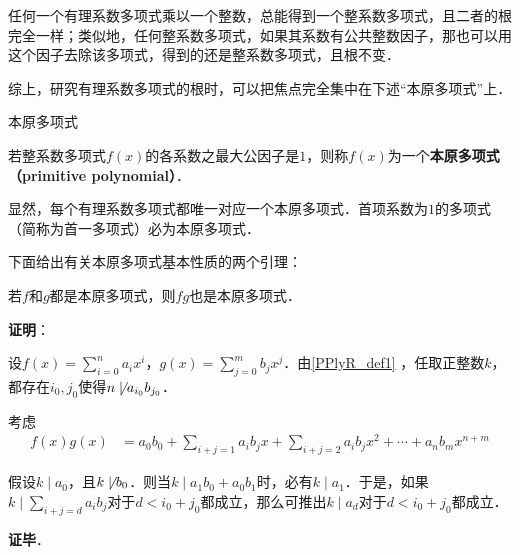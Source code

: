 
任何一个有理系数多项式乘以一个整数，总能得到一个整系数多项式，且二者的根完全一样；类似地，任何整系数多项式，如果其系数有公共整数因子，那也可以用这个因子去除该多项式，得到的还是整系数多项式，且根不变．

综上，研究有理系数多项式的根时，可以把焦点完全集中在下述“本原多项式”上．


\begin{definition}{本原多项式}\label{PPlyR_def1}

若整系数多项式$f(x)$的各系数之最大公因子是$1$，则称$f(x)$为一个\textbf{本原多项式（primitive polynomial）}．

\end{definition}

显然，每个有理系数多项式都唯一对应一个本原多项式．首项系数为$1$的多项式（简称为首一多项式）必为本原多项式．

下面给出有关本原多项式基本性质的两个引理：

\begin{lemma}{}
若$f$和$g$都是本原多项式，则$fg$也是本原多项式．
\end{lemma}

\textbf{证明}：

设$f(x) = \sum_{i=0}^n a_ix^i$，$g(x) = \sum_{j=0}^m b_jx^j$．由\autoref{PPlyR_def1} ，任取正整数$k$，都存在$i_0, j_0$使得$n\not\mid a_{i_0}b_{j_0}$．

考虑
\begin{equation}
\begin{aligned}
f(x)g(x) &= a_0b_0 + \sum_{i+j=1}a_ib_jx + \sum_{i+j=2}a_ib_jx^2+\cdots +a_nb_mx^{n+m}
\end{aligned}
\end{equation}

假设$k\mid a_0$，且$k\not\mid b_0$．则当$k\mid a_1b_0+a_0b_1$时，必有$k\mid a_1$．于是，如果$k\mid\sum_{i+j=d}a_ib_j$对于$d<i_0+j_0$都成立，那么可推出$k\mid a_d$对于$d<i_0+j_0$都成立．



\textbf{证毕}．


















